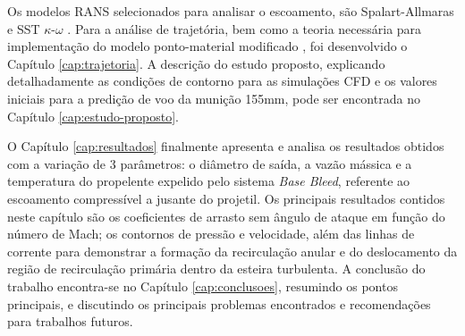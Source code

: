 Os modelos RANS selecionados para analisar o escoamento, são Spalart-Allmaras \cite{Spalart1992} e SST $\kappa$-$\omega$ \cite{Menter1994TwoequationET,Menter2003,Menter2009}. Para a análise de trajetória, bem como a teoria necessária para implementação do modelo ponto-material modificado \cite{stanag4355}, foi desenvolvido o Capítulo \ref{cap:trajetoria}. A descrição do estudo proposto, explicando detalhadamente as condições de contorno para as simulações CFD e os valores iniciais para a predição de voo da munição 155mm, pode ser encontrada no Capítulo \ref{cap:estudo-proposto}.

O Capítulo \ref{cap:resultados} finalmente apresenta e analisa os resultados obtidos com a variação de 3 parâmetros: o diâmetro de saída, a vazão mássica e a temperatura do propelente expelido pelo sistema \textit{Base Bleed}, referente ao escoamento compressível a jusante do projetil. Os principais resultados contidos neste capítulo são os coeficientes de arrasto sem ângulo de ataque em função do número de Mach; os contornos de pressão e velocidade, além das linhas de corrente para demonstrar a formação da recirculação anular e do deslocamento da região de recirculação primária dentro da esteira turbulenta. A conclusão do trabalho encontra-se no Capítulo \ref{cap:conclusoes}, resumindo os pontos principais, e discutindo os principais problemas encontrados e recomendações para trabalhos futuros.